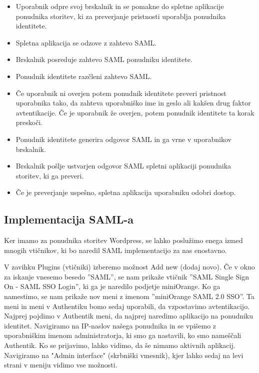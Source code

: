 \documentclass[a4paper,12pt,openright]{book}
\begin{document}
\begin{itemize}
    \item Uporabnik odpre svoj brskalnik in se pomakne do spletne aplikacije ponudnika storitev, ki za preverjanje pristnosti uporablja ponudnika identitete.
    \item Spletna aplikacija se odzove z zahtevo SAML.
    \item Brskalnik posreduje zahtevo SAML ponudniku identitete.
    \item Ponudnik identitete razčleni zahtevo SAML.
    \item Če uporabnik ni overjen potem ponudnik identitete preveri pristnost uporabnika tako, da zahteva uporabniško ime in geslo ali kakšen drug faktor avtentikacije. Če je uporabnik že overjen, potem ponudnik identitete ta korak preskoči.
    \item Ponudnik identitete generira odgovor SAML in ga vrne v uporabnikov brskalnik.
    \item Brskalnik pošlje ustvarjen odgovor SAML spletni aplikaciji ponudnika storitev, ki ga preveri.
    \item Če je preverjanje uspešno, spletna aplikacija uporabniku odobri dostop.
\end{itemize}
    
\subsection{Implementacija SAML-a}

Ker imamo za ponudnika storitev Wordpress, se lahko poslužimo enega izmed mnogih vtičnikov, ki bo naredil SAML implementacijo za nas enostavno.  

V zavihku Plugins (vtičniki) izberemo možnost Add new (dodaj novo). Če v okno za iskanje vnesemo besedo ''SAML'', se nam prikaže vtičnik  ''SAML Single Sign On - SAML SSO Login'', ki ga je naredilo podjetje miniOrange\cite{miniOrange}. 
\newline
Ko ga namestimo, se nam prikaže nov meni z imenom ''miniOrange SAML 2.0 SSO''. Ta meni in meni v Authentiku bomo sedaj uporabili, da vzpostavimo avtentikacijo. 
\newline
Najprej pojdimo v Authentik meni, da najprej naredimo aplikacijo na ponudniku identitet. Navigiramo na IP-naslov našega ponudnika in se vpišemo z uporabniškim imenom administratorja, ki smo ga nastavili, ko smo nameščali Authentik. Ko se prijavimo, lahko vidimo, da še nimamo aktivnih aplikacij. Navigiramo na "Admin interface" (skrbniški vmesnik), kjer lahko sedaj na levi strani v meniju vidimo vse možnosti.
\end{document}

